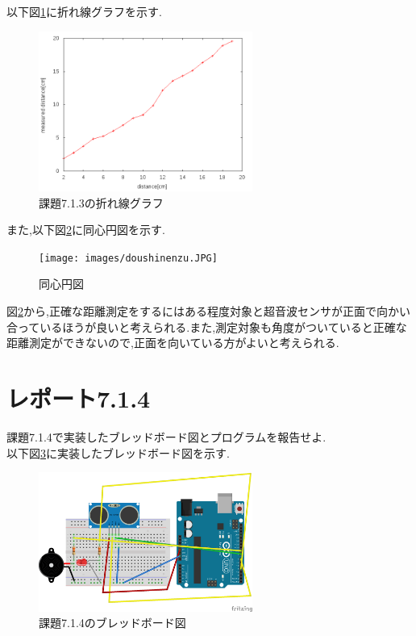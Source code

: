 \documentclass{jarticle}
\begin{document}
以下図\ref{fig:kadai7-1-3-oresen}に折れ線グラフを示す.

\begin{figure}[H]
\begin{center}
\includegraphics[width=7.0cm]{images/kadai7-1-3.png}
\caption{課題7.1.3の折れ線グラフ}
\label{fig:kadai7-1-3-oresen}
\end{center}
\end{figure}

また,以下図\ref{fig:kadai7-1-3-doushin}に同心円図を示す.

\begin{figure}[H]
\begin{center}
\texttt{[image: images/doushinenzu.JPG]}
\caption{同心円図}
\label{fig:kadai7-1-3-doushin}
\end{center}
\end{figure}

図\ref{fig:kadai7-1-3-doushin}から,正確な距離測定をするにはある程度対象と超音波センサが正面で向かい合っているほうが良いと考えられる.また,測定対象も角度がついていると正確な距離測定ができないので,正面を向いている方がよいと考えられる.

\section{レポート7.1.4}
課題7.1.4で実装したブレッドボード図とプログラムを報告せよ. \\

以下図\ref{fig:kadai7-1-4}に実装したブレッドボード図を示す.

\begin{figure}[H]
\begin{center}
\includegraphics[width=7.0cm]{images/kadai7-1-4.png}
\caption{課題7.1.4のブレッドボード図}
\label{fig:kadai7-1-4}
\end{center}
\end{figure}
\end{document}

